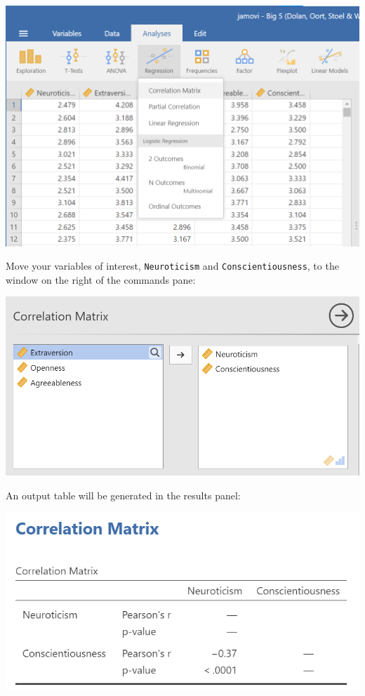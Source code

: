 \documentclass[
]{book}
\begin{document}
\includegraphics{img/CorrelationCommands.png}

Move your variables of interest, \texttt{Neuroticism} and \texttt{Conscientiousness}, to the window on the right of the commands pane:

\includegraphics{img/Correlation_Variables.png}

An output table will be generated in the results panel:

\includegraphics{img/Correlation_Output.png}
\end{document}
